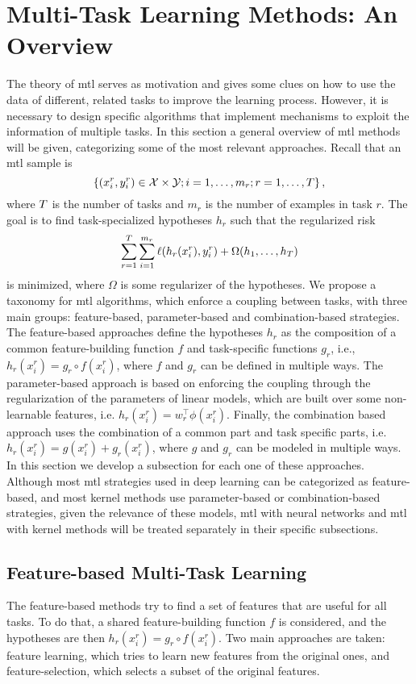 \section{Multi-Task Learning Methods: An Overview}\label{sec:ch3_overview}
The theory of \acrshort{mtl} serves as motivation and gives some clues on how to use the data of different, related tasks to improve the learning process. However, it is necessary to design specific algorithms that implement mechanisms to exploit the information of multiple tasks.
In this section a general overview of \acrshort{mtl} methods will be given, categorizing some of the most relevant approaches. 
%
Recall that an \acrshort{mtl} sample is
$$ \left\{(x_i^r, y_i^r) \in \mathcal{X} \times \mathcal{Y}; i=1,\ldots, m_r; r=1,\ldots, T\right\},$$
where $T$ is the number of tasks and $m_r$ is the number of examples in task $r$.
The goal is to find task-specialized hypotheses $h_r$ such that the regularized risk 
\begin{equation}
    \nonumber
    \sum_{r=1}^T \sum_{i=1}^{m_r} \ell(h_r(x_i^r), y_i^r) + \Omega(h_1, \ldots, h_T)
\end{equation}
is minimized, where $\Omega$ is some regularizer of the hypotheses. 
We propose a taxonomy for \acrshort{mtl} algorithms, which enforce a coupling between tasks, with three main groups: feature-based, parameter-based and combination-based strategies. 
The feature-based approaches define the hypotheses $h_r$ as the composition of a common feature-building function $f$ and task-specific functions $g_r$, i.e., $h_r(x_i^r) = g_r \circ f(x_i^r)$, where $f$ and $g_r$ can be defined in multiple ways.
The parameter-based approach is based on enforcing the coupling through the regularization of the parameters of linear models, which are built over some non-learnable features, i.e. $h_r(x_i^r) = w_r^\intercal \phi(x_i^r)$.
Finally, the combination based approach uses the combination of a common part and task specific parts, i.e. $h_r(x_i^r) = g(x_i^r) + g_r(x_i^r)$, where $g$ and $g_r$ can be modeled in multiple ways.
In this section we develop a subsection for each one of these approaches.
%
Although most \acrshort{mtl} strategies used in deep learning can be categorized as feature-based, and most kernel methods use parameter-based or combination-based strategies, given the relevance of these models, \acrshort{mtl} with neural networks and \acrshort{mtl} with kernel methods will be treated separately in their specific subsections. 

\subsection{Feature-based Multi-Task Learning}\label{subsec:featbased_mtl}
The feature-based methods try to find a set of features that are useful for all tasks.
To do that, a shared feature-building function $f$ is considered, and the hypotheses are then $h_r(x_i^r) = g_r \circ f(x_i^r)$.
Two main approaches are taken: feature learning, which tries to learn new features from the original ones, and feature-selection, which selects a subset of the original features.




